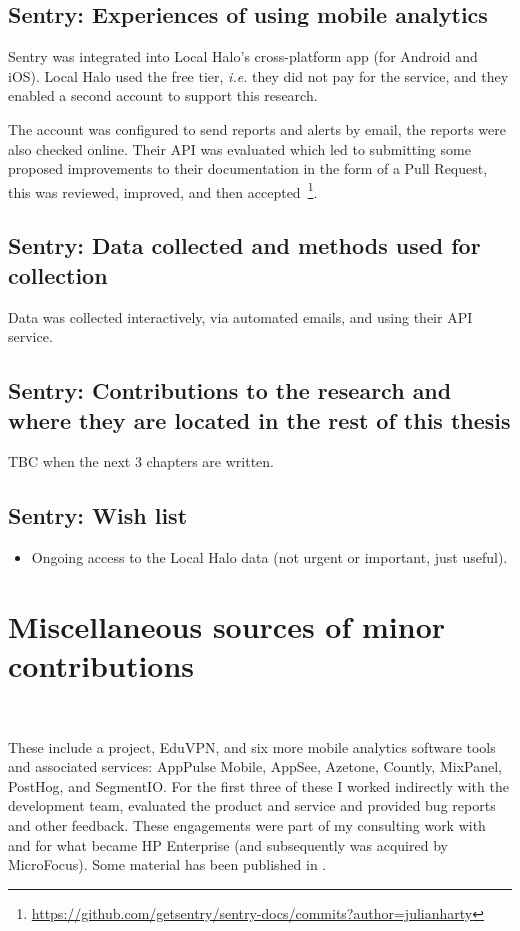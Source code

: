 \subsection{Sentry: Experiences of using mobile analytics}
Sentry was integrated into Local Halo's cross-platform app (for Android and iOS). Local Halo used the free tier, \emph{i.e.} they did not pay for the service, and they enabled a second account to support this research.

The account was configured to send reports and alerts by email, the reports were also checked online. Their API was evaluated which led to submitting some proposed improvements to their documentation in the form of a Pull Request, this was reviewed, improved, and then accepted~\footnote{\url{https://github.com/getsentry/sentry-docs/commits?author=julianharty}}.

\subsection{Sentry: Data collected and methods used for collection}

Data was collected interactively, via automated emails, and using their API service.

\subsection{Sentry: Contributions to the research and where they are located in the rest of this thesis}
TBC when the next 3 chapters are written.

\subsection*{Sentry: Wish list}
{\small
\begin{itemize}
    \item Ongoing access to the Local Halo data (not urgent or important, just useful).
\end{itemize}
}


\clearpage


\section{Miscellaneous sources of minor contributions}~\label{section-case-study-misc-contributions}

These include a project, EduVPN, and six more mobile analytics software tools and associated services: AppPulse Mobile, AppSee, Azetone, Countly, MixPanel, PostHog, and SegmentIO. For the first three of these I worked indirectly with the development team, evaluated the product and service and provided bug reports and other feedback. These engagements were part of my consulting work with and for what became HP Enterprise (and subsequently was acquired by MicroFocus). Some material has been published in \citet{harty_aymer_playbook_2016}.

